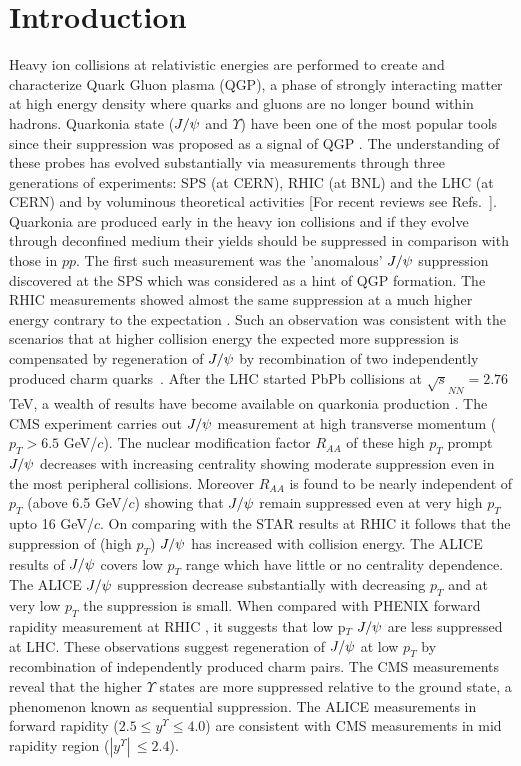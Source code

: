 \documentclass[aps,prc,preprint,superscriptaddress,showpacs,showkeys]{revtex4-1}
\begin{document}
\section{Introduction}
  Heavy ion collisions at relativistic energies are performed to create and characterize 
Quark Gluon plasma (QGP), a phase of strongly interacting matter at high energy density 
where quarks and gluons are no longer bound within hadrons. 
  Quarkonia state ($J/\psi$ and $\Upsilon$) have been one of the most popular tools 
since their suppression was proposed as a signal of QGP \cite{Matsui:1986dk}.
  The understanding of these probes has evolved substantially via measurements 
through three generations of experiments: SPS (at CERN), RHIC (at BNL) and the LHC (at CERN) 
and by voluminous theoretical activities [For recent reviews see 
Refs.~\cite{Schukraft:2013wba,Kluberg:2009wc,Brambilla:2010cs}].
Quarkonia are produced early in the heavy ion collisions and if they evolve
through deconfined medium their yields should be suppressed in comparison with those in $pp$. 
 The first such measurement was the 'anomalous' $J/\psi$ suppression discovered at the SPS 
which was considered as a hint of QGP formation. The RHIC measurements showed almost the 
same suppression at a much higher energy contrary to the expectation \cite{Brambilla:2010cs,Adare:2011yf}. 
 Such an observation was consistent with the scenarios that at higher collision energy the 
expected more suppression is compensated by regeneration of $J/\psi$ by recombination of two 
independently produced charm quarks~\cite{Andronic:2003zv}.
After the LHC started PbPb collisions at $\sqrt s_{NN} = 2.76$ TeV, a wealth of
results have become available on quarkonia production \cite{Muller:2012zq,P.ShuklaforCMS:2014vna}. 
  The CMS experiment carries out $J/\psi$ measurement at high transverse momentum 
($p_T>6.5$ GeV/$c$). The nuclear modification factor  $R_{AA}$ of these high $p_T$ 
prompt $J/\psi$ decreases with increasing centrality \cite{Chatrchyan:2012np,Mironov:2013jaa} showing
moderate suppression even in the most peripheral collisions. 
  Moreover $R_{AA}$ is found to be nearly independent of $p_T$ (above 6.5 GeV$/c$) showing 
that $J/\psi$ remain suppressed even at very high $p_T$ upto 16 GeV/$c$.
 On comparing with the STAR results \cite{Tang:2011kr} at RHIC it follows that the suppression of
(high $p_T$) $J/\psi$ has increased with collision energy.
  The ALICE results \cite{Abelev:2013ila} of $J/\psi$ covers low $p_T$ range which
have little or no centrality dependence. The ALICE $J/\psi$ suppression decrease 
substantially with decreasing $p_T$ and at very low $p_T$ the suppression is small.
  When compared with PHENIX forward rapidity measurement at 
RHIC \cite{Adare:2011yf}, it suggests that low p$_T$ $J/\psi$ are less suppressed at LHC.
 These observations suggest regeneration of $J/\psi$ at low $p_T$ by 
recombination of independently produced charm pairs.
  The CMS measurements \cite{Chatrchyan:2011pe,Chatrchyan:2012lxa} reveal that 
the higher $\Upsilon$ states are more suppressed relative to the ground state, 
a phenomenon known as sequential suppression. The ALICE
 measurements in forward rapidity ($2.5 \leq y^{\Upsilon} \leq 4.0$) are 
consistent with CMS measurements in mid rapidity region ($|y^{\Upsilon}|\,\leq 2.4$).
\end{document}
